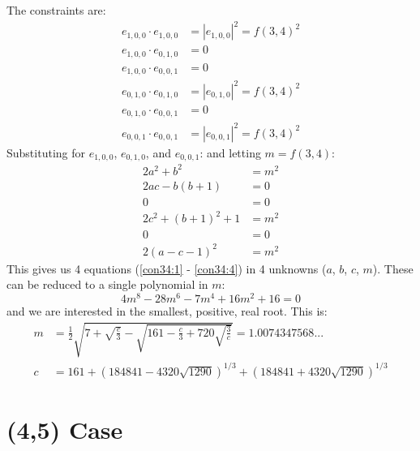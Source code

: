 \documentclass[12pt,titlepage]{article}
\numberwithin{equation}{section}
\begin{document}
The constraints are:
\begin{align*}
e_{1,0,0} \cdot e_{1,0,0} &= |e_{1,0,0}|^2 = f(3,4)^2 \\
e_{1,0,0} \cdot e_{0,1,0} &= 0                        \\
e_{1,0,0} \cdot e_{0,0,1} &= 0                        \\
e_{0,1,0} \cdot e_{0,1,0} &= |e_{0,1,0}|^2 = f(3,4)^2 \\
e_{0,1,0} \cdot e_{0,0,1} &= 0                        \\
e_{0,0,1} \cdot e_{0,0,1} &= |e_{0,0,1}|^2 = f(3,4)^2
\end{align*}
Substituting for $e_{1,0,0}$, $e_{0,1,0}$, and $e_{0,0,1}$: and
letting $m = f(3,4)$:
\begin{align}
2a^2 + b^2         &= m^2 \label{con34:1} \\
2ac - b(b+1)       &= 0   \label{con34:2} \\
0                  &= 0   \nonumber       \\
2c^2 + (b+1)^2 + 1 &= m^2 \label{con34:3} \\
0                  &= 0   \nonumber       \\
2(a-c-1)^2         &= m^2 \label{con34:4}
\end{align}
This gives us 4 equations (\ref{con34:1} - \ref{con34:4}) in 4 unknowns
($a$, $b$, $c$, $m$).
These can be reduced to a single polynomial in $m$:
\begin{equation*}
4 m^8 - 28 m^6 - 7 m^4 + 16 m^2 + 16 = 0
\end{equation*}
and we are interested in the smallest, positive, real root.  This is:
\begin{align*}
m &=
\frac{1}{2}
  \sqrt{7+
    \sqrt{\frac{c}{3}}-\sqrt{161-\frac{c}{3}+720\sqrt{\frac{3}{c}}}
  }
   = 1.0074347568...
\\
c &= 161 + (184841 - 4320\sqrt{1290})^{1/3}
         + (184841 + 4320\sqrt{1290})^{1/3}
\end{align*}

\section{(4,5) Case}
\end{document}
